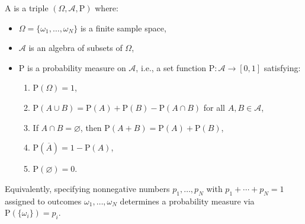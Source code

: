 A  is a triple $(\Omega, \mathcal{A}, \text{P})$ where:
\begin{itemize}
\item $\Omega = \{\omega_1, \ldots, \omega_N\}$ is a finite sample space,
\item $\mathcal{A}$ is an algebra of subsets of $\Omega$,
\item $\text{P}$ is a probability measure on $\mathcal{A}$, i.e., a set function $\text{P}: \mathcal{A} \to [0,1]$ satisfying:
  \begin{enumerate}
  \item $\text{P}(\Omega) = 1$,
  \item $\text{P}(A \cup B) = \text{P}(A) + \text{P}(B) - \text{P}(A \cap B)$ for all $A, B \in \mathcal{A}$,
  \item If $A \cap B = \varnothing$, then $\text{P}(A + B) = \text{P}(A) + \text{P}(B)$,
  \item $\text{P}(\overline{A}) = 1 - \text{P}(A)$,
  \item $\text{P}(\varnothing) = 0$.
  \end{enumerate}
\end{itemize}
Equivalently, specifying nonnegative numbers $p_1, \ldots, p_N$ with $p_1 + \cdots + p_N = 1$ assigned to outcomes $\omega_1, \ldots, \omega_N$ determines a probability measure via $\text{P}(\{\omega_i\}) = p_i$.
